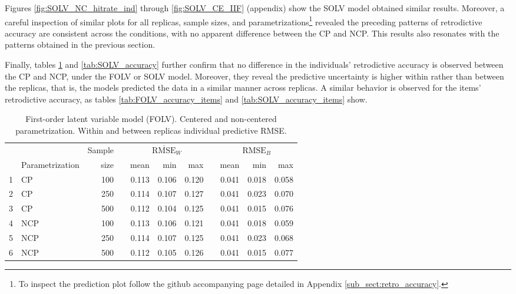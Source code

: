 Figures \ref{fig:SOLV_NC_hitrate_ind} through \ref{fig:SOLV_CE_IIF} (appendix) show the SOLV model obtained similar results. Moreover, a careful inspection of similar plots for all replicas, sample sizes, and parametrizations\footnote{To inspect the prediction plot follow the github accompanying page detailed in Appendix \ref{sub_sect:retro_accuracy}.} revealed the preceding patterns of retrodictive accuracy are consistent across the conditions, with no apparent difference between the CP and NCP. This results also resonates with the patterns obtained in the previous section.

Finally, tables \ref{tab:FOLV_accuracy} and \ref{tab:SOLV_accuracy} further confirm that no difference in the individuals' retrodictive accuracy is observed between the CP and NCP, under the FOLV or SOLV model. Moreover, they reveal the predictive uncertainty is higher within rather than between the replicas, that is, the models predicted the data in a similar manner across replicas. A similar behavior is observed for the items' retrodictive accuracy, as tables \ref{tab:FOLV_accuracy_items} and \ref{tab:SOLV_accuracy_items} show.
%
\begin{table}[H]
	\centering
	\begin{tabular}{rlrrrrrrrrr}
		\hline
		& & Sample && \multicolumn{3}{c}{ $\overline{\text{RMSE}}_{W}$ } && \multicolumn{3}{c}{ $\text{RMSE}_{B}$ } \\
		\cmidrule(rl){5-7} \cmidrule(rl){9-11}  
		& Parametrization & size  && mean & min & max && mean & min & max \\ 
		\hline\hline
		1 & CP & 100 && 0.113 & 0.106 & 0.120 && 0.041 & 0.018 & 0.058 \\ 
		2 & CP & 250 && 0.114 & 0.107 & 0.127 && 0.041 & 0.023 & 0.070 \\
		3 & CP & 500 && 0.112 & 0.104 & 0.125 && 0.041 & 0.015 & 0.076 \\
		\hline
		4 & NCP & 100 && 0.113 & 0.106 & 0.121 && 0.041 & 0.018 & 0.059 \\ 
		5 & NCP & 250 && 0.114 & 0.107 & 0.125 && 0.041 & 0.023 & 0.068 \\ 
		6 & NCP & 500 && 0.112 & 0.105 & 0.126 && 0.041 & 0.015 & 0.077 \\
		\hline
	\end{tabular}
	\caption[First-order latent variable model (FOLV). Centered and non-centered parametrization. Within and between replicas individual predictive RMSE.]%
	{First-order latent variable model (FOLV). Centered and non-centered parametrization. Within and between replicas individual predictive RMSE.}
	\label{tab:FOLV_accuracy}
\end{table}
